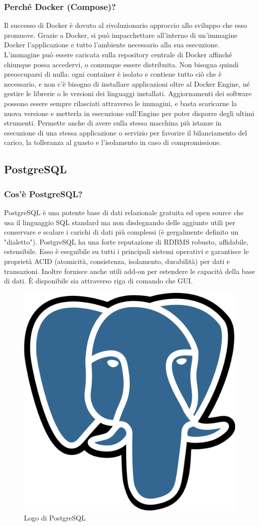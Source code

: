             \subsubsection{Perché Docker (Compose)?}
                Il successo di Docker è dovuto al rivoluzionario approccio allo sviluppo che esso promuove. Grazie a Docker, si può impacchettare all'interno di un'immagine Docker l'applicazione e tutto l'ambiente necessario alla sua esecuzione. L'immagine può essere caricata sulla repository centrale di Docker affinché chiunque possa accedervi, o comunque essere distribuita. Non bisogna quindi preoccuparsi di nulla: ogni container è isolato e contiene tutto ciò che è necessario, e non c'è bisogno di installare applicazioni oltre al Docker Engine, né gestire le librerie o le versioni dei linguaggi installati. Aggiornamenti dei software possono essere sempre rilasciati attraverso le immagini, e basta scaricarne la nuova versione e metterla in esecuzione sull'Engine per poter disporre degli ultimi strumenti. Permette anche di avere sulla stessa macchina più istanze in esecuzione di una stessa applicazione o servizio per favorire il bilanciamento del carico, la tolleranza al guasto e l'isolamento in caso di compromissione.

        \subsection{PostgreSQL}
            \subsubsection{Cos'è PostgreSQL? \cite{PostgreSQL1}}
                PostgreSQL è una potente base di dati relazionale gratuita ed open source che usa il linguaggio SQL standard ma non disdegnando delle aggiunte utili per conservare e scalare i carichi di dati più complessi (è gergalmente definito un "dialetto"). PostgreSQL ha una forte reputazione di RDBMS robusto, affidabile, estensibile. Esso è eseguibile su tutti i principali sistemi operativi e garantisce le proprietà ACID (atomicità, consistenza, isolamento, durabilità) per dati e transazioni. Inoltre fornisce anche utili add-on per estendere le capacità della base di dati. È disponibile sia attraverso riga di comando che GUI.
            \begin{figure}[htbp!]
                \centering
                \includegraphics[width=0.2\linewidth]{Immagini/System Design/PostgreSQL.png}
                \caption{Logo di PostgreSQL}
            \end{figure}
